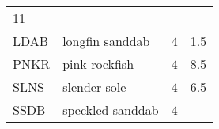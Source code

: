 \documentclass[]{article}
\begin{document}
\begin{longtable}[c]{@{}llll@{}}
\begin{minipage}[t]{0.23\columnwidth}
11
\end{minipage}
\\\addlinespace
\begin{minipage}[t]{0.08\columnwidth}\raggedright
LDAB
\end{minipage} & \begin{minipage}[t]{0.36\columnwidth}\raggedright
longfin sanddab
\end{minipage} & \begin{minipage}[t]{0.21\columnwidth}\raggedright
4
\end{minipage} & \begin{minipage}[t]{0.23\columnwidth}\raggedright
1.5
\end{minipage}
\\\addlinespace
\begin{minipage}[t]{0.08\columnwidth}\raggedright
PNKR
\end{minipage} & \begin{minipage}[t]{0.36\columnwidth}\raggedright
pink rockfish
\end{minipage} & \begin{minipage}[t]{0.21\columnwidth}\raggedright
4
\end{minipage} & \begin{minipage}[t]{0.23\columnwidth}\raggedright
8.5
\end{minipage}
\\\addlinespace
\begin{minipage}[t]{0.08\columnwidth}\raggedright
SLNS
\end{minipage} & \begin{minipage}[t]{0.36\columnwidth}\raggedright
slender sole
\end{minipage} & \begin{minipage}[t]{0.21\columnwidth}\raggedright
4
\end{minipage} & \begin{minipage}[t]{0.23\columnwidth}\raggedright
6.5
\end{minipage}
\\\addlinespace
\begin{minipage}[t]{0.08\columnwidth}\raggedright
SSDB
\end{minipage} & \begin{minipage}[t]{0.36\columnwidth}\raggedright
speckled sanddab
\end{minipage} & \begin{minipage}[t]{0.21\columnwidth}\raggedright
4
\end{minipage} & \begin{minipage}[t]{0.23\columnwidth}\raggedright

\end{minipage}
\end{longtable}
\end{document}
